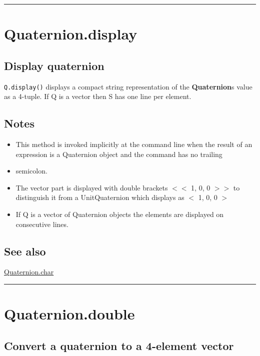 \vspace{1.5ex}\hrule

\hypertarget{Quaternion.display}{\section*{Quaternion.display}}
\subsection*{Display quaternion}


\texttt{Q.display()} displays a compact string representation of the \textbf{\color{red} Quaternion}\textquotesingle s value
as a 4-tuple.  If Q is a vector then S has one line per element.


\subsection*{Notes}
\begin{itemize}
  \item This method is invoked implicitly at the command line when the result    of an expression is a Quaternion object and the command has no trailing
  \item semicolon.
  \item The vector part is displayed with double brackets $<$$<$ 1, 0, 0 $>$$>$ to    distinguish it from a UnitQuaternion which displays as $<$ 1, 0, 0 $>$
  \item If Q is a vector of Quaternion objects the elements are displayed on    consecutive lines.
\end{itemize}

\subsection*{See also}


\hyperlink{Quaternion.char}{\color{blue} Quaternion.char}

\vspace{1.5ex}\hrule

\hypertarget{Quaternion.double}{\section*{Quaternion.double}}
\subsection*{Convert a quaternion to a 4-element vector}


